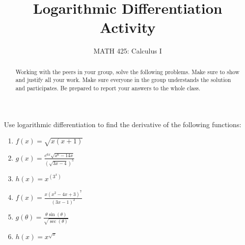 \documentclass{ximera}
\title{Logarithmic Differentiation Activity}
\author{MATH 425: Calculus I}
\begin{document}
\begin{abstract}
   Working with the peers in your group, solve the following problems. Make sure to show and justify all your work. Make sure everyone in the group understands the solution and participates. Be prepared to report your answers to the whole class. 
\end{abstract}
\maketitle


\begin{exercise}
    Use logarithmic differentiation to find the derivative of the following functions: 

    \begin{enumerate}
        \item $\displaystyle f(x)=\sqrt{x(x+1)} $
        
        \item $\displaystyle g(x)=\frac{e^{6x}\sqrt{x^6-14x}}{(\sqrt{3x-4})^5}$
        \item $\displaystyle h(x)=x^{(3^x)}$
        \item $\displaystyle f(x)=\frac{x(x^2-4x+3)^7}{(3x-1)^2}$
        \item $\displaystyle g(\theta)=\frac{\theta\sin(\theta)}{\sqrt{\sec(\theta)}}$\
        \item $\displaystyle h(x)=x^{\sqrt{x}}$    
    \end{enumerate}

\end{exercise}
\end{document}

